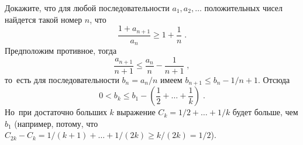 \problem{}
Докажите, что для любой последовательности $a_1, a_2, \ldots$ положительных
чисел найдется такой номер $n$, что
\[
    \frac{1 + a_{n+1}}{a_n}
\geq
    1 + \frac{1}{n}
\; . \]
\solution
Предположим противное, тогда
\[
    \frac{a_{n+1}}{n + 1}
\leq
    \frac{a_n}{n} - \frac{1}{n + 1}
\; , \]
то~есть для последовательности $b_n = a_n / n$ имеем
\(
    b_{n+1}
\leq
    b_n - 1 / n + 1
\).
Отсюда
\[
    0
<
    b_k
\leq
    b_1 -
    \left(
        \frac{1}{2} + \ldots + \frac{1}{k}
    \right)
\; . \]
Но~при достаточно больших $k$ выражение $C_k = 1 / 2 + \ldots + 1 / k$ будет
больше, чем $b_1$
(например, потому, что
\(
    C_{2k} - C_k
=
    1 / (k + 1) + \ldots + 1 / (2 k) \geq k / (2 k)
=
    1 / 2
\)).
\endproblem
